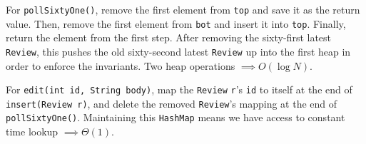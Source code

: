 \begin{solution}
For \lstinline$pollSixtyOne()$, remove the first element from \lstinline$top$ and save it as the return value. Then, remove the first element from \lstinline$bot$ and insert it into \lstinline$top$. Finally, return the element from the first step. After removing the sixty-first latest \lstinline$Review$, this pushes the old sixty-second latest \lstinline$Review$ up into the first heap in order to enforce the invariants. Two heap operations $\implies O(\log N)$.

For \lstinline$edit(int id, String body)$, map the \lstinline$Review$ \lstinline$r$'s \lstinline$id$ to itself at the end of \lstinline$insert(Review r)$, and delete the removed \lstinline$Review$'s mapping at the end of \lstinline$pollSixtyOne()$. Maintaining this \lstinline$HashMap$ means we have access to constant time lookup $\implies \Theta(1)$.
\end{solution}
